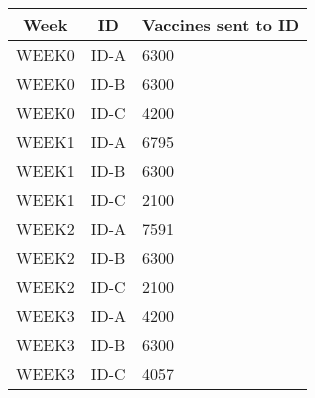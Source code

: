 \documentclass[12pt]{article}
\begin{document}
{    \begin{center}
        \begin{table}[H]
            \begin{tabular}{|l|l|l|}
            \hline
            \multicolumn{1}{|c|}{\textbf{Week}} & \multicolumn{1}{c|}{\textbf{ID}} & \multicolumn{1}{c|}{\textbf{Vaccines sent to   ID}} \\ \hline
            WEEK0                               & ID-A                             & 6300                                                \\ \hline
            WEEK0                               & ID-B                             & 6300                                                \\ \hline
            WEEK0                               & ID-C                             & 4200                                                \\ \hline
            WEEK1                               & ID-A                             & 6795                                                \\ \hline
            WEEK1                               & ID-B                             & 6300                                                \\ \hline
            WEEK1                               & ID-C                             & 2100                                                \\ \hline
            WEEK2                               & ID-A                             & 7591                                                \\ \hline
            WEEK2                               & ID-B                             & 6300                                                \\ \hline
            WEEK2                               & ID-C                             & 2100                                                \\ \hline
            WEEK3                               & ID-A                             & 4200                                                \\ \hline
            WEEK3                               & ID-B                             & 6300                                                \\ \hline
            WEEK3                               & ID-C                             & 4057                                                \\ \hline

\end{tabular}
\end{table}
\end{center}}
\end{document}
